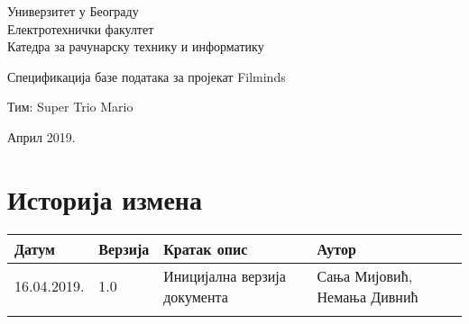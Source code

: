 \documentclass[12pt,a4paper]{article}
\begin{document}
\begin{titlepage}
\begin{center}
    Универзитет у Београду \\
    Електротехнички факултет \\
    Катедра за рачунарску технику и информатику \\
    \vfill

    {\fontsize{50}{60}\selectfont Спецификација базе података за пројекат Filminds }
    \vskip 0.6cm

    {\large Тим: Super Trio Mario}
    \vskip 0.3cm

    \vfill
    \vfill

    Април 2019.
    \hfill
\end{center}
\end{titlepage}

\section*{Историја измена}
\noindent
\setcellgapes{4pt}
\makegapedcells
\begin{tabularx}{\linewidth}{|l|l|X|X|}
    \hline
    \textbf{Датум} & \textbf{Верзија} & \textbf{Кратак опис} & \textbf{Аутор} \\
    \hline
    16.04.2019. & 1.0 & Иницијална верзија документа & Сања Мијовић, \newline Немања Дивнић \\
    \hline
    & & & \\
    \hline
\end{tabularx}
\newpage

\tableofcontents
\newpage




\end{document}
